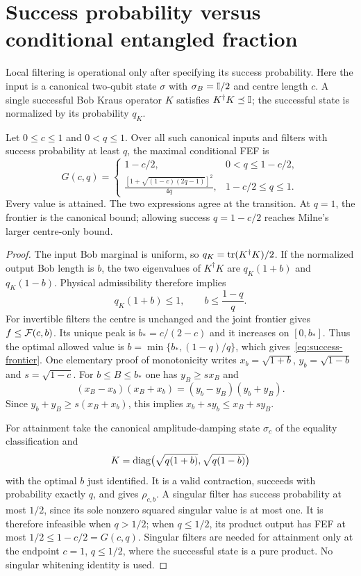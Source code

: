 \section{Success probability versus conditional entangled fraction}\label{sec:success}
Local filtering is operational only after specifying its success probability. Here the input is a canonical two-qubit state $\sigma$ with $\sigma_B=\mathbb I/2$ and centre length $c$. A single successful Bob Kraus operator $K$ satisfies $K^\dagger K\preceq\mathbb I$; the successful state is normalized by its probability $q_K$.

\begin{theorem}\label{thm:success}
Let $0\le c\le1$ and $0<q\le1$. Over all such canonical inputs and filters with success probability at least $q$, the maximal conditional FEF is
\begin{equation}\label{eq:success-frontier}
 \boxed{
 G(c,q)=\begin{cases}
 1-c/2,&0<q\le1-c/2,\\[2mm]
 \displaystyle\frac{[1+\sqrt{(1-c)(2q-1)}]^2}{4q},&1-c/2\le q\le1.
 \end{cases}}
\end{equation}
Every value is attained. The two expressions agree at the transition. At $q=1$, the frontier is the canonical bound; allowing success $q=1-c/2$ reaches Milne's larger centre-only bound.
\end{theorem}
\begin{proof}
The input Bob marginal is uniform, so $q_K=\operatorname{tr}(K^\dagger K)/2$. If the normalized output Bob length is $b$, the two eigenvalues of $K^\dagger K$ are $q_K(1+b)$ and $q_K(1-b)$. Physical admissibility therefore implies
\[
 q_K(1+b)\le1,\qquad b\le\frac{1-q}{q}.
\]
For invertible filters the centre is unchanged and the joint frontier gives $f\le\mathcal F(c,b)$. Its unique peak is $b_*=c/(2-c)$ and it increases on $[0,b_*]$. Thus the optimal allowed value is $b=\min\{b_*,(1-q)/q\}$, which gives~\eqref{eq:success-frontier}. One elementary proof of monotonicity writes $x_b=\sqrt{1+b}$, $y_b=\sqrt{1-b}$ and $s=\sqrt{1-c}$. For $b\le B\le b_*$ one has $y_B\ge s x_B$ and
\[
 (x_B-x_b)(x_B+x_b)=(y_b-y_B)(y_b+y_B).
\]
Since $y_b+y_B\ge s(x_B+x_b)$, this implies $x_b+s y_b\le x_B+s y_B$.

For attainment take the canonical amplitude-damping state $\sigma_c$ of the equality classification and
\[
 K=\operatorname{diag}\bigl(\sqrt{q(1+b)},\sqrt{q(1-b)}\bigr)
\]
with the optimal $b$ just identified. It is a valid contraction, succeeds with probability exactly $q$, and gives $\rho_{c,b}$. A singular filter has success probability at most $1/2$, since its sole nonzero squared singular value is at most one. It is therefore infeasible when $q>1/2$; when $q\le1/2$, its product output has FEF at most $1/2\le1-c/2=G(c,q)$. Singular filters are needed for attainment only at the endpoint $c=1$, $q\le1/2$, where the successful state is a pure product. No singular whitening identity is used.
\end{proof}

